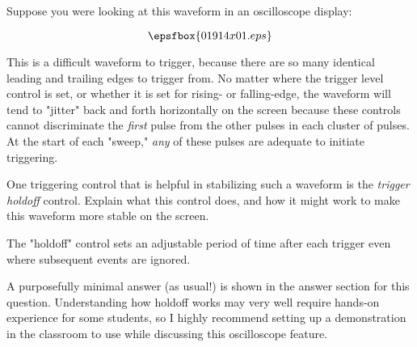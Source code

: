 

Suppose you were looking at this waveform in an oscilloscope display:

$$\epsfbox{01914x01.eps}$$

This is a difficult waveform to trigger, because there are so many identical leading and trailing edges to trigger from.  No matter where the trigger level control is set, or whether it is set for rising- or falling-edge, the waveform will tend to "jitter" back and forth horizontally on the screen because these controls cannot discriminate the {\it first} pulse from the other pulses in each cluster of pulses.  At the start of each "sweep," {\it any} of these pulses are adequate to initiate triggering.

One triggering control that is helpful in stabilizing such a waveform is the {\it trigger holdoff} control.  Explain what this control does, and how it might work to make this waveform more stable on the screen.







The "holdoff" control sets an adjustable period of time after each trigger even where subsequent events are ignored.







A purposefully minimal answer (as usual!) is shown in the answer section for this question.  Understanding how holdoff works may very well require hands-on experience for some students, so I highly recommend setting up a demonstration in the classroom to use while discussing this oscilloscope feature.




